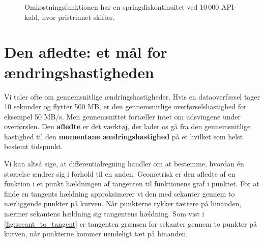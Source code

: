 \begin{figure}[htbp]
\centering
{}
\caption{Omkostningsfunktionen har en springdiskontinuitet ved 10\,000 API-kald, hvor pristrinnet skifter.}
\label{fig:jump_discontinuity}
\end{figure}

\section{Den afledte: et mål for ændringshastigheden}
\label{sec:ch10-derivative}

Vi taler ofte om gennemsnitlige ændringshastigheder. Hvis en dataoverførsel tager 10 sekunder og flytter 500 MB, er den gennemsnitlige overførselshastighed for eksempel 50 MB/s. Men gennemsnittet fortæller intet om udsvingene under overførslen. Den \textbf{afledte} er det værktøj, der lader os gå fra den gennemsnitlige hastighed til den \textbf{momentane ændringshastighed} på et hvilket som helst bestemt tidspunkt.

Vi kan altså sige, at differentialregning handler om at bestemme, hvordan én størrelse ændrer sig i forhold til en anden. Geometrisk er den afledte af en funktion i et punkt hældningen af tangenten til funktionens graf i punktet. For at finde en tangents hældning approksimerer vi den med sekanter gennem to nærliggende punkter på kurven. Når punkterne rykker tættere på hinanden, nærmer sekantens hældning sig tangentens hældning. Som vist i \autoref{fig:secant_to_tangent} er tangenten grænsen for sekanter gennem to punkter på kurven, når punkterne kommer uendeligt tæt på hinanden.

